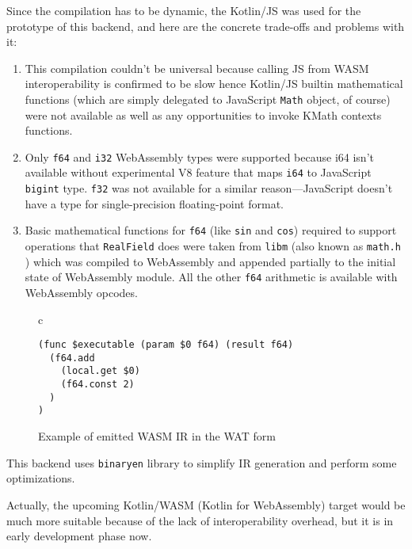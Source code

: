 \documentclass[conference]{IEEEtran}
\begin{document}
Since the compilation has to be dynamic, the Kotlin/JS was used for the prototype of this backend, and here are the concrete trade-offs and problems with it:

\begin{enumerate}
    \item This compilation couldn't be universal because calling JS from WASM interoperability is confirmed to be slow hence Kotlin/JS builtin mathematical functions (which are simply delegated to JavaScript \texttt{Math} object, of course) were not available as well as any opportunities to invoke KMath contexts functions.
    \item Only \texttt{f64} and \texttt{i32} WebAssembly types were supported because i64 isn't available without experimental V8 feature that maps \texttt{i64} to JavaScript \texttt{bigint} type. \texttt{f32} was not available for a similar reason---JavaScript doesn't have a type for single-precision floating-point format.
    \item Basic mathematical functions for \texttt{f64} (like \texttt{sin} and \texttt{cos}) required to support operations that \texttt{RealField} does were taken from \texttt{libm} (also known as \texttt{math.h} \cite{ISO:2011:IIIb}) which was compiled to WebAssembly and appended partially to the initial state of WebAssembly module. All the other \texttt{f64} arithmetic is available with WebAssembly opcodes.
\end{enumerate}

\begin{figure}[ht]
    \begin{center}
    \begin{tabular}{c}
    \begin{lstlisting}
(func $executable (param $0 f64) (result f64)
  (f64.add
    (local.get $0)
    (f64.const 2)
  )
)
    \end{lstlisting}
    \end{tabular}
    \end{center}
    \caption{Example of emitted WASM IR in the WAT form}\label{ls4}
\end{figure}

This backend uses \texttt{binaryen} \cite{binaryen} library to simplify IR generation and perform some optimizations.

Actually, the upcoming Kotlin/WASM (Kotlin for WebAssembly) target would be much more suitable because of the lack of interoperability overhead, but it is in early development phase now.
\end{document}
